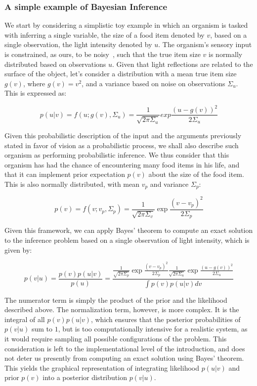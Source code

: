 \subsubsection{A simple example of Bayesian Inference}
We start by considering a simplistic toy example in which an organism is tasked with inferring a single variable, the size of a food item denoted by $v$, based on a single observation, the light intensity denoted by $u$. The organism's sensory input is constrained, as ours, to be noisy~\cite{barlow1956retinal}, such that the true item size $v$ is normally distributed based on observations $u$. Given that light reflections are related to the surface of the object, let's consider a distribution with a mean true item size $g(v)$, where $g(v) = v^2$, and a variance based on noise on observations $\Sigma_u$. This is expressed as:

\begin{equation}\label{eq_proba_intro}
    p(u|v) = f(u;g(v), \Sigma_u) = \frac{1}{\sqrt{2\pi\Sigma_u}} exp{\frac{(u-g(v))^2}{2\Sigma_u}} 
\end{equation}

Given this probabilistic description of the input and the arguments previously stated in favor of vision as a probabilistic process, we shall also describe such organism as performing probabilistic inference. We thus consider that this organism has had the chance of encountering many food items in his life, and that it can implement prior expectation $p(v)$ about the size of the food item. This is also normally distributed, with mean $v_p$ and variance $\Sigma_p$:

\begin{equation}
p(v) = f (v; v_p, \varSigma_p) = \frac{1}{\sqrt{2\pi\Sigma_v}} \exp{\frac{(v-v_p)^2}{2\Sigma_p}}
\end{equation}

Given this framework, we can apply Bayes' theorem to compute an exact solution to the inference problem based on a single observation of light intensity, which is given by:

\begin{equation}
\label{eq_denominator}
p(v|u) = \frac{p(v)p(u|v)}{p(u)} = \frac{\frac{1}{\sqrt{2\pi\Sigma_p}} \exp{\frac{(v-v_p)^2}{2\Sigma_p}} \frac{1}{\sqrt{2\pi\Sigma_u}} \exp{\frac{(u-g(v))^2}{2\Sigma_u}}}{\int p(v) p(u|v)dv}
\end{equation}

The numerator term is simply the product of the prior and the likelihood described above. The normalization term, however, is more complex. It is the integral of all $p(v)p(u|v)$, which ensures that the posterior probabilities of $p(v|u)$ sum to $1$, but is too computationally intensive for a realistic system, as it would require sampling all possible configurations of the problem. This consideration is left to the implementational level of the introduction, and does not deter us presently from computing an exact solution using Bayes' theorem. This yields the graphical representation of integrating likelihood $p(u|v)$ and prior $p(v)$ into a posterior distribution $p(v|u)$. 

